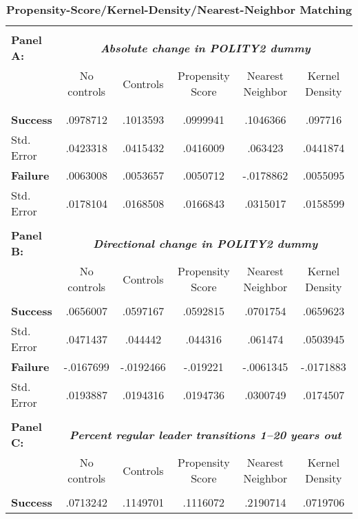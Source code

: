 \documentclass[11pt]{article}
\begin{document}
\begin{landscape}


\begin{table}[h] \small
	\centering
\caption{ \textbf{Propensity-Score/Kernel-Density/Nearest-Neighbor Matching} }  
\begin{tabular}{l*{5}{c}}
	\hline\hline \\[-1.8ex]
	\textbf{Panel A:} & \multicolumn{5}{c}{ \textbf{\textit{Absolute change in POLITY2 dummy}} } \\
	&  No controls & Controls & Propensity Score & Nearest Neighbor &  Kernel Density \\
	\\[-1.8ex] \hline \\[-1.8ex] 
	\textbf{Success}     &    .0978712&    .1013593&    .0999941&    .1046366&     .097716\\
	Std. Error   &    .0423318&    .0415432&    .0416009&     .063423&    .0441874\\
	\textbf{Failure}     &    .0063008&    .0053657&    .0050712&   -.0178862&    .0055095\\
	Std. Error   &    .0178104&    .0168508&    .0166843&    .0315017&    .0158599\\
	\hline \\[-1.8ex] 
	\textbf{Panel B:} & \multicolumn{5}{c}{ \textbf{\textit{Directional change in POLITY2 dummy}} } \\
	&  No controls & Controls & Propensity Score & Nearest Neighbor &  Kernel Density \\
	\hline \\[-1.8ex]
	\textbf{Success}     &    .0656007&    .0597167&    .0592815&    .0701754&    .0659623\\
	Std. Error   &    .0471437&     .044442&     .044316&     .061474&    .0503945\\
	\textbf{Failure}     &   -.0167699&   -.0192466&    -.019221&   -.0061345&   -.0171883\\
	Std. Error   &    .0193887&    .0194316&    .0194736&    .0300749&    .0174507\\
	\hline \\[-1.8ex] 
	\textbf{Panel C:} & \multicolumn{5}{c}{ \textbf{\textit{Percent regular leader transitions 1–20 years out}} } \\
	&  No controls & Controls & Propensity Score & Nearest Neighbor &  Kernel Density \\
	\hline \\[-1.8ex]
	\textbf{Success}     &    .0713242&    .1149701&    .1116072&    .2190714&    .0719706\\

\end{tabular}
\end{table}
\end{landscape}
\end{document}
